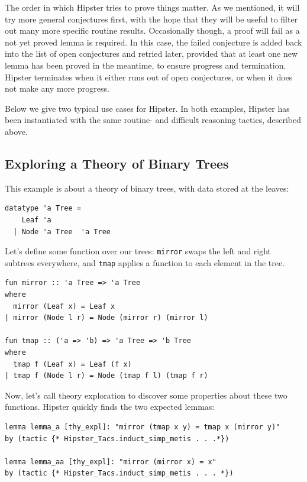 The order in which Hipster tries to prove things matter. As we mentioned, it will try more general conjectures first, with the hope that they will be useful to filter out many more specific routine results. Occasionally though, a proof will fail as a not yet proved lemma is required. In this case, the failed conjecture is added back into the list of open conjectures and retried later, provided that at least one new lemma has been proved in the meantime, to ensure progress and termination. Hipster terminates when it either runs out of open conjectures, or when it does not make any more progress. 

Below we give two typical use cases for Hipster. In both examples, Hipster has been instantiated with the  same routine- and difficult reasoning tactics, described above.

\subsection{Exploring a Theory of Binary Trees}
\label{sec:tree}
This example is about a theory of binary trees, with data stored at the leaves:
\begin{small}
\begin{verbatim}
datatype 'a Tree = 
    Leaf 'a 
  | Node 'a Tree  'a Tree
\end{verbatim}
\end{small}
Let's define some function over our trees: \texttt{mirror} swaps the left and right subtrees everywhere, and \texttt{tmap} applies a function to each element in the tree.
\begin{small}
\begin{verbatim}
fun mirror :: 'a Tree => 'a Tree
where
  mirror (Leaf x) = Leaf x
| mirror (Node l r) = Node (mirror r) (mirror l)

fun tmap :: ('a => 'b) => 'a Tree => 'b Tree
where
  tmap f (Leaf x) = Leaf (f x)
| tmap f (Node l r) = Node (tmap f l) (tmap f r) 
\end{verbatim} 
\end{small}
Now, let's call theory exploration to discover some properties about these two functions. Hipster quickly finds the two expected lemmas:  
\begin{small}
\begin{verbatim}
lemma lemma_a [thy_expl]: "mirror (tmap x y) = tmap x (mirror y)"
by (tactic {* Hipster_Tacs.induct_simp_metis . . .*})

lemma lemma_aa [thy_expl]: "mirror (mirror x) = x"
by (tactic {* Hipster_Tacs.induct_simp_metis . . . *})
\end{verbatim}
\end{small}
